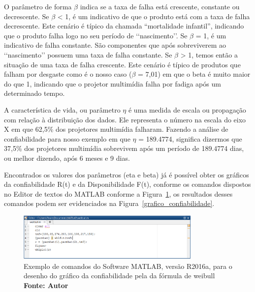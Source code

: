 O parâmetro de forma $ \beta $ indica se a taxa de falha está crescente, constante ou decrescente. Se $ \beta $ < 1, é um indicativo de que o produto está com a taxa de falha decrescente. Este cenário é típico da chamada “mortalidade infantil”, indicando que o produto falha logo no seu período de \lq\lq nascimento\rq\rq. Se $ \beta $ = 1, é um indicativo de falha constante. São componentes que após sobreviverem ao {\lq\lq nascimento\rq\rq} possuem uma taxa de falha constante. Se $ \beta $ > 1, temos então a situação de uma taxa de falha crescente. Este cenário é típico de produtos que falham por desgaste como é o nosso caso ($ \beta $ = 7,01) em que o beta é muito maior do que 1, indicando que o projetor multimídia falha por fadiga após um determinado tempo.

A característica de vida, ou parâmetro $ \eta $ é uma medida de escala ou propagação com relação à distribuição dos dados. Ele representa o número na escala do eixo X em que 62,5\% dos projetores multimídia falharam. Fazendo a análise de confiabilidade para nosso exemplo em que $ \eta $ = 189.4774, significa dizermos que 37,5\% dos projetores multimídia sobrevivem após um período de 189.4774 dias, ou melhor dizendo, após 6 meses e 9 dias.

Encontrados os valores dos parâmetros (eta e beta) já é possível obter os gráficos da confiabilidade R(t) e da Disponibilidade F(t), conforme os comandos dispostos no Editor de textos do MATLAB conforme a Figura~\ref{plotweibull}, os resultados desses comandos podem ser evidenciados na Figura~\ref{grafico_confiabilidade}. 

\graphicspath{{figuras/}}
\begin{figure}[H]
\centering
\includegraphics[width=0.8\textwidth]{plotweibull.eps}
\caption{Exemplo de comandos do Software MATLAB, versão R2016a, para o desenho do gráfico da confiabilidade pela da fórmula de weibull \textbf{Fonte: Autor}}
\label{plotweibull}
\end{figure}

